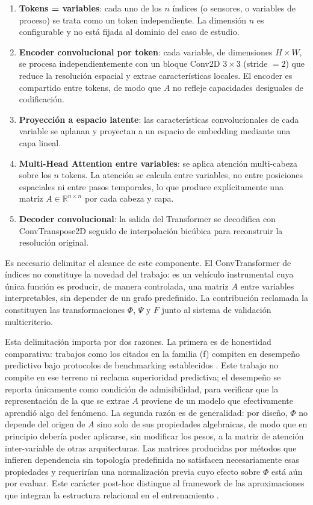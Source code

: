 \begin{enumerate}
\item \textbf{Tokens = variables}: cada uno de los $n$ índices (o sensores, o variables de proceso) se trata como un token independiente. La dimensión $n$ es configurable y no está fijada al dominio del caso de estudio.
\item \textbf{Encoder convolucional por token}: cada variable, de dimensiones $H \times W$, se procesa independientemente con un bloque Conv2D $3\times 3$ (stride $=2$) que reduce la resolución espacial y extrae características locales. El encoder es compartido entre tokens, de modo que $A$ no refleje capacidades desiguales de codificación.
\item \textbf{Proyección a espacio latente}: las características convolucionales de cada variable se aplanan y proyectan a un espacio de embedding mediante una capa lineal.
\item \textbf{Multi-Head Attention entre variables}: se aplica atención multi-cabeza sobre los $n$ tokens. La atención se calcula entre variables, no entre posiciones espaciales ni entre pasos temporales, lo que produce explícitamente una matriz $A \in \mathbb{R}^{n\times n}$ por cada cabeza y capa.
\item \textbf{Decoder convolucional}: la salida del Transformer se decodifica con ConvTranspose2D seguido de interpolación bicúbica para reconstruir la resolución original.
\end{enumerate}

Es necesario delimitar el alcance de este componente. El ConvTransformer de índices no constituye la novedad del trabajo: es un vehículo instrumental cuya única función es producir, de manera controlada, una matriz $A$ entre variables interpretables, sin depender de un grafo predefinido. La contribución reclamada la constituyen las transformaciones $\Phi$, $\Psi$ y $F$ junto al sistema de validación multicriterio.

Esta delimitación importa por dos razones. La primera es de honestidad comparativa: trabajos como los citados en la familia (f) compiten en desempeño predictivo bajo protocolos de benchmarking establecidos \cite{liu2024itransformer,cai2024msgnet}. Este trabajo no compite en ese terreno ni reclama superioridad predictiva; el desempeño se reporta únicamente como condición de admisibilidad, para verificar que la representación de la que se extrae $A$ proviene de un modelo que efectivamente aprendió algo del fenómeno. La segunda razón es de generalidad: por diseño, $\Phi$ no depende del origen de $A$ sino solo de sus propiedades algebraicas, de modo que en principio debería poder aplicarse, sin modificar los pesos, a la matriz de atención inter-variable de otras arquitecturas. Las matrices producidas por métodos que infieren dependencia sin topología predefinida \cite{tew2024kans} no satisfacen necesariamente esas propiedades y requerirían una normalización previa cuyo efecto sobre $\Phi$ está aún por evaluar. Este carácter post-hoc distingue al framework de las aproximaciones que integran la estructura relacional en el entrenamiento \cite{zhang2026ehtgnn,zhou2026causal}.

